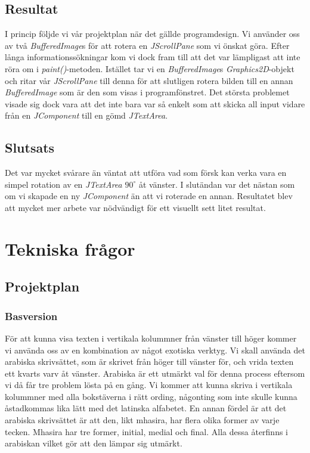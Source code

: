 \documentclass[a4paper,11p,twoside]{article}
\begin{document}
\subsection{Resultat}
I princip följde vi vår projektplan när det gällde programdesign. Vi använder oss av två \emph{BufferedImage}s för att rotera en \emph{JScrollPane} som vi önskat göra. Efter långa informationssökningar kom vi dock fram till att det var lämpligast att inte röra om i \emph{paint()}-metoden. Istället tar vi en \emph{BufferedImage}s \emph{Graphics2D}-objekt och ritar vår \emph{JScrollPane} till denna för att slutligen rotera bilden till en annan \emph{BufferedImage} som är den som visas i programfönstret.  Det största problemet visade sig dock vara att det inte bara var så enkelt som att skicka all input vidare från en \emph{JComponent} till en gömd \emph{JTextArea}.

\subsection{Slutsats}
Det var mycket svårare än väntat att utföra vad som försk kan verka vara en simpel rotation av en \emph{JTextArea} $90^\circ$ åt vänster. I slutändan var det nästan som om vi skapade en ny \emph{JComponent} än att vi roterade en annan. Resultatet blev att mycket mer arbete var nödvändigt för ett visuellt sett litet resultat.

\section{Tekniska frågor}
\subsection{Projektplan}
\subsubsection{Basversion}
För att kunna visa texten i vertikala kolummner från vänster till höger kommer vi använda oss av en kombination av något exotiska verktyg. Vi skall använda det arabiska skrivsättet, som är skrivet från höger till vänster för, och vrida texten ett kvarts varv åt vänster. Arabiska är ett utmärkt val för denna process eftersom vi då får tre problem lösta på en gång. Vi kommer att kunna skriva i vertikala kolummner med alla bokstäverna i rätt ording, någonting som inte skulle kunna åstadkommas lika lätt med det latinska alfabetet. En annan fördel är att det arabiska skrivsättet är att den, likt mhasira, har flera olika former av varje tecken. Mhasira har tre former, initial, medial och final. Alla dessa återfinns i arabiskan vilket gör att den lämpar sig utmärkt.
\end{document}
